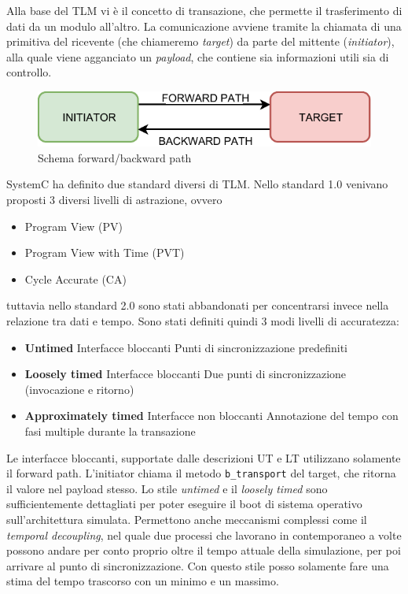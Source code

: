\documentclass[10pt,a4paper,oneside]{scrbook}
\begin{document}
Alla base del TLM vi è il concetto di transazione, che permette il trasferimento di dati da un modulo all'altro.
La comunicazione avviene tramite la chiamata di una primitiva del ricevente (che chiameremo \textit{target})
da parte del mittente (\textit{initiator}), alla quale viene agganciato un \textit{payload}, che contiene sia
informazioni utili sia di controllo.
\begin{figure}[h]
    \centering
    \includegraphics[width=1\linewidth]{"img/initiator target"}
    \caption{Schema forward/backward path}
    \label{fig:forward-backward-path}
\end{figure}

\noindent
SystemC ha definito due standard diversi di TLM. Nello standard 1.0 venivano proposti 3 diversi livelli di astrazione, ovvero
\begin{itemize}
    \item Program View (PV)
    \item Program View with Time (PVT)
    \item Cycle Accurate (CA)
\end{itemize}
tuttavia nello standard 2.0 sono stati abbandonati per concentrarsi invece nella relazione tra dati e tempo.
Sono stati definiti quindi 3 modi livelli di accuratezza:
\begin{itemize}
    \item \textbf{Untimed}
    \subitem Interfacce bloccanti
    \subitem Punti di sincronizzazione predefiniti
    \item \textbf{Loosely timed}
    \subitem Interfacce bloccanti
    \subitem Due punti di sincronizzazione (invocazione e ritorno)
    \item \textbf{Approximately timed}
    \subitem Interfacce non bloccanti
    \subitem Annotazione del tempo con fasi multiple durante la transazione
\end{itemize}
Le interfacce bloccanti, supportate dalle descrizioni UT e LT utilizzano solamente il forward path.
L'initiator chiama il metodo \texttt{b\_transport} del target, che ritorna il valore nel payload stesso.
Lo stile \textit{untimed} e il \textit{loosely timed} sono sufficientemente dettagliati per poter eseguire il boot 
di sistema operativo sull'architettura simulata. Permettono anche meccanismi complessi come
il \textit{temporal decoupling}, nel quale due processi che lavorano in contemporaneo a volte possono andare per conto proprio oltre il tempo attuale
della simulazione, per poi arrivare al punto di sincronizzazione. Con questo stile posso solamente fare una stima del tempo trascorso con un minimo e un massimo.
\end{document}
